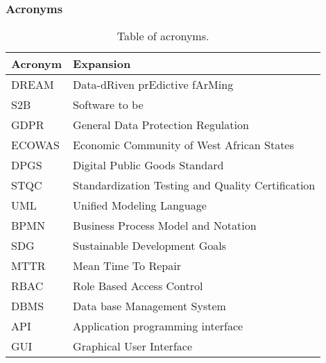 \subsubsection{Acronyms}
\begin{table}[H]
    \setlength\arrayrulewidth{1pt}
    \centering
    \begin{tabular}{|l|l|}
        \rowcolor{myblue}
        \hline
        \color{white}Acronym & \color{white}Expansion \\
        \hline
        \textsc{DREAM}  &    Data-dRiven prEdictive fArMing \\
        \hline
        \textsc{S2B}     &   Software to be \\
        \hline
        \textsc{GDPR}  &    General Data Protection Regulation\\
        \hline
        \textsc{ECOWAS}  &    Economic Community of West African States\\
        \hline
        \textsc{DPGS}  &    Digital Public Goods Standard\\
        \hline
        \textsc{STQC}  &    Standardization Testing and Quality Certification\\
        \hline
        \textsc{UML}  &    Unified Modeling Language\\
        \hline
        \textsc{BPMN}  &    Business Process Model and Notation\\
        \hline
        \textsc{SDG}  &    Sustainable Development Goals\\
        \hline
        \textsc{MTTR}  &    Mean Time To Repair\\
        \hline
        \textsc{RBAC}  &    Role Based Access Control \\
        \hline
        \textsc{DBMS}  &    Data base Management System \\
        \hline
        \textsc{API}  &    Application programming interface \\
        \hline
        \textsc{GUI}  &    Graphical User Interface \\
        \hline
    \end{tabular}
    
    \caption{\label{tab:acronymsTable}Table of acronyms.}
    
\end{table}

